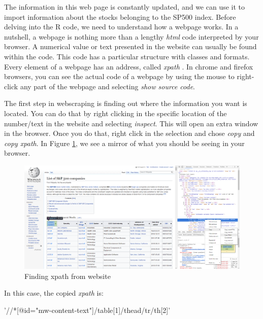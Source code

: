 \documentclass[11pt,]{book}
\newenvironment{Shaded}{\begin{snugshade}}{\end{snugshade}}
\newcommand{\StringTok}[1]{\textcolor[rgb]{0.5,0.5,0.5}{#1}}
\begin{document}
The information in this web page is constantly updated, and we can use
it to import information about the stocks belonging to the SP500 index.
Before delving into the R code, we need to understand how a webpage
works. In a nutshell, a webpage is nothing more than a lengthy
\emph{html} code interpreted by your browser. A numerical value or text
presented in the website can usually be found within the code. This code
has a particular structure with classes and formats. Every element of a
webpage has an address, called \emph{xpath} . In chrome and firefox
browsers, you can see the actual code of a webpage by using the mouse to
right-click any part of the webpage and selecting \emph{show source
code}.

The first step in webscraping is finding out where the information you
want is located. You can do that by right clicking in the specific
location of the number/text in the website and selecting \emph{inspect}.
This will open an extra window in the browser. Once you do that, right
click in the selection and chose \emph{copy} and \emph{copy xpath}. In
Figure \ref{fig:SP500-Wikipedia-webscraping}, we see a mirror of what
you should be seeing in your browser.

\begin{figure}[!htbp]

{\centering \includegraphics[width=0.75\linewidth]{figs/SP500-Wikipedia_webscraping} 

}

\caption{Finding xpath from website}\label{fig:SP500-Wikipedia-webscraping}
\end{figure}

In this case, the copied \emph{xpath} is:

\begin{Shaded}
\begin{Highlighting}[]
\StringTok{'//*[@id="mw-content-text"]/table[1]/thead/tr/th[2]'}
\end{Highlighting}
\end{Shaded}
\end{document}
